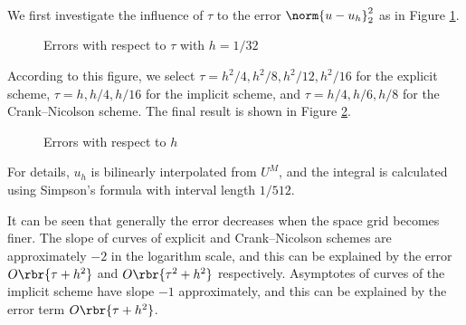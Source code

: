 \documentclass[english, nochinese]{pkupaper}
\begin{document}
\begin{thmquestion}
\ 
\begin{thmanswer}
We first investigate the influence of $\tau$ to the error $ \norm{ u - u_h }_2^2 $ as in Figure \ref{Fig:Time}.

\begin{figure}[htbp]
\centering
\scalebox{1.0}{}
\caption{Errors with respect to $\tau$ with $ h = 1 / 32 $}
\label{Fig:Time}
\end{figure}

According to this figure, we select $ \tau = h^2 / 4, h^2 / 8, h^2 / 12, h^2 / 16 $ for the explicit scheme, $ \tau = h, h / 4, h / 16 $ for the implicit scheme, and $ \tau = h / 4, h / 6, h / 8 $ for the Crank--Nicolson scheme. The final result is shown in Figure \ref{Fig:Space}.

\begin{figure}[htbp]
\centering
\scalebox{1.0}{}
\caption{Errors with respect to $h$}
\label{Fig:Space}
\end{figure}

For details, $u_h$ is bilinearly interpolated from $U^M$, and the integral is calculated using Simpson's formula with interval length $ 1 / 512 $.

It can be seen that generally the error decreases when the space grid becomes finer. The slope of curves of explicit and Crank--Nicolson schemes are approximately $-2$ in the logarithm scale, and this can be explained by the error $ O \rbr{ \tau + h^2 } $ and $ O \rbr{ \tau^2 + h^2 } $ respectively. Asymptotes of curves of the implicit scheme have slope $-1$ approximately, and this can be explained by the error term $ O \rbr{ \tau + h^2 } $.
\end{thmanswer}
\end{thmquestion}
\end{document}

